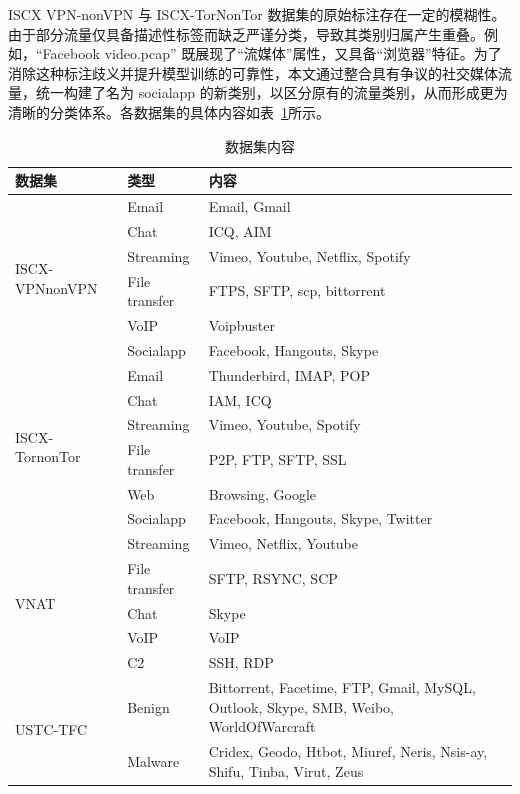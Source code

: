 ISCX VPN-nonVPN 与 ISCX-TorNonTor 数据集的原始标注存在一定的模糊性。由于部分流量仅具备描述性标签而缺乏严谨分类，导致其类别归属产生重叠。例如，“Facebook video.pcap” 既展现了“流媒体”属性，又具备“浏览器”特征。为了消除这种标注歧义并提升模型训练的可靠性，本文通过整合具有争议的社交媒体流量，统一构建了名为 socialapp 的新类别，以区分原有的流量类别，从而形成更为清晰的分类体系。各数据集的具体内容如表~\ref{table:datasets}所示。

\begin{table}[h]
  \centering
  \caption{数据集内容}
  \label{table:datasets}
  \begin{tabularx}{\textwidth}{l l X}
    \hline
    \textbf{数据集} & \textbf{类型} & \textbf{内容}\\ \hline
    \multirow{6}{*}{ISCX-VPNnonVPN} 
    & Email & Email, Gmail \\
    & Chat & ICQ, AIM \\
    & Streaming & Vimeo, Youtube, Netflix, Spotify \\
    & File transfer & FTPS, SFTP, scp, bittorrent \\
    & VoIP & Voipbuster \\
    & Socialapp & Facebook, Hangouts, Skype \\ \hline
    \multirow{6}{*}{ISCX-TornonTor} 
    & Email & Thunderbird, IMAP, POP \\
    & Chat & IAM, ICQ \\
    & Streaming & Vimeo, Youtube, Spotify \\
    & File transfer & P2P, FTP, SFTP, SSL \\
    & Web & Browsing, Google \\
    & Socialapp & Facebook, Hangouts, Skype, Twitter \\ \hline
    \multirow{5}{*}{VNAT} 
    & Streaming & Vimeo, Netflix, Youtube \\
    & File transfer & SFTP, RSYNC, SCP \\
    & Chat & Skype \\
    & VoIP & VoIP \\
    & C2 & SSH, RDP \\ \hline
    \multirow{3}{*}{USTC-TFC}
    & Benign & Bittorrent, Facetime, FTP, Gmail, MySQL, Outlook, Skype, SMB, Weibo, WorldOfWarcraft \\
    & Malware & Cridex, Geodo, Htbot, Miuref, Neris, Nsis-ay, Shifu, Tinba, Virut, Zeus \\ \hline
  \end{tabularx}
\end{table}

